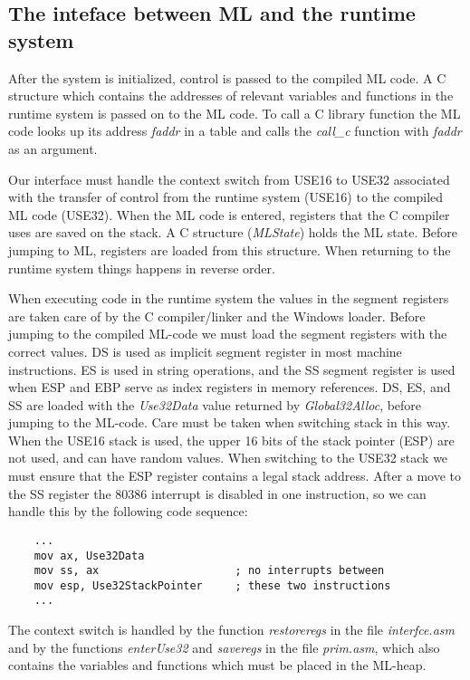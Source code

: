 \subsection{The inteface between ML and the runtime system}

After the system is initialized, control is passed to the compiled ML
code. A C structure which contains the addresses of relevant variables
and functions in the runtime system is passed on to the ML code. To
call a C library function the ML code looks up its address {\em
faddr\/} in a table and calls the {\em call\_c\/} function with {\em
faddr\/} as an argument.

Our interface must handle the context switch from USE16 to USE32
associated with the transfer of control from the runtime system
(USE16) to the compiled ML code (USE32). When the ML code is entered,
registers that the C compiler uses are saved on the stack. A C
structure ({\em MLState\/}) holds the ML state. Before jumping to ML,
registers are loaded from this structure.  When returning to the
runtime system things happens in reverse order.

When executing code in the runtime system the values in the segment
registers are taken care of by the C compiler/linker and the Windows
loader. Before jumping to the compiled ML-code we must load the
segment registers with the correct values. DS is used as implicit
segment register in most machine instructions. ES is used in string
operations, and the SS segment register is used when ESP and EBP serve
as index registers in memory references. DS, ES, and SS are loaded
with the {\em Use32Data\/} value returned by {\em Global32Alloc\/},
before jumping to the ML-code.  Care must be taken when switching
stack in this way.  When the USE16 stack is used, the upper 16 bits of
the stack pointer (ESP) are not used, and can have random values. When
switching to the USE32 stack we must ensure that the ESP register
contains a legal stack address. After a move to the SS register the
80386 interrupt is disabled in one instruction, so we can handle this
by the following code sequence:
\begin{verbatim}
    ...
    mov ax, Use32Data
    mov ss, ax                     ; no interrupts between
    mov esp, Use32StackPointer     ; these two instructions
    ...
\end{verbatim}

The context switch is handled by the function {\em restoreregs\/} in
the file {\em interfce.asm\/} and by the functions {\em enterUse32\/}
and {\em saveregs\/} in the file {\em prim.asm\/}, which also contains
the variables and functions which must be placed in the ML-heap.

